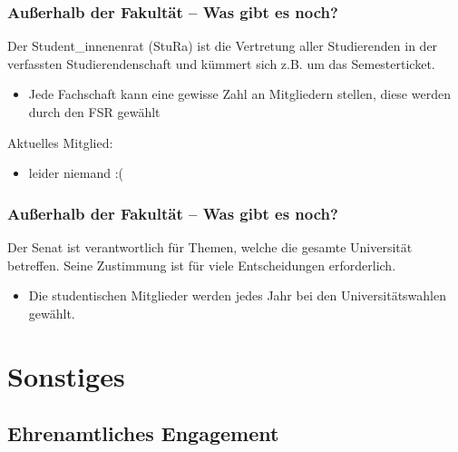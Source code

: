 \documentclass[10pt]{beamer}
\begin{document}
\begin{frame}
	\frametitle{Außerhalb der Fakultät -- Was gibt es noch?}
	
	\begin{block}{\vphantom{X}}
		Der Student\_innenenrat (StuRa) ist die Vertretung aller Studierenden in der verfassten Studierendenschaft und kümmert sich z.B. um das Semesterticket.
	\end{block}

	\begin{itemize}
		\item Jede Fachschaft kann eine gewisse Zahl an Mitgliedern stellen, diese werden durch den FSR gewählt
	\end{itemize}

	\vspace*{1.0cm}

	Aktuelles Mitglied:

	\begin{itemize}
		\item leider niemand :(
	\end{itemize}
\end{frame}

\begin{frame}
	\frametitle{Außerhalb der Fakultät -- Was gibt es noch?}

	\begin{block}{\vphantom{X}}
		Der Senat ist verantwortlich für Themen, welche die gesamte Universität betreffen. Seine Zustimmung ist für viele Entscheidungen erforderlich.
	\end{block}

	\begin{itemize}
		\item Die studentischen Mitglieder werden jedes Jahr bei den Universitätswahlen gewählt.
	\end{itemize}
\end{frame}


\section{Sonstiges}

\subsection*{Ehrenamtliches Engagement}
\end{document}
